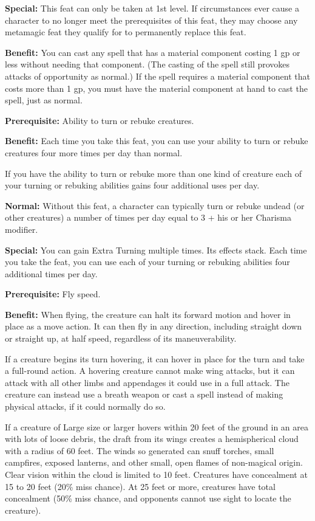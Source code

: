 \textbf{Special:} This feat can only be taken at 1st level. If circumstances ever cause a character to no longer meet the prerequisites of this feat, they may choose any metamagic feat they qualify for to permanently replace this feat.


\textbf{Benefit:} You can cast any spell that has a material component costing 1 gp or less without needing that component. (The casting of the spell still provokes attacks of opportunity as normal.) If the spell requires a material component that costs more than 1 gp, you must have the material component at hand to cast the spell, just as normal.


\textbf{Prerequisite:} Ability to turn or rebuke creatures.

\textbf{Benefit:} Each time you take this feat, you can use your ability to turn or rebuke creatures four more times per day than normal.

If you have the ability to turn or rebuke more than one kind of creature each of your turning or rebuking abilities gains four additional uses per day.

\textbf{Normal:} Without this feat, a character can typically turn or rebuke undead (or other creatures) a number of times per day equal to 3 + his or her Charisma modifier.

\textbf{Special:} You can gain Extra Turning multiple times. Its effects stack. Each time you take the feat, you can use each of your turning or rebuking abilities four additional times per day.


\textbf{Prerequisite:} Fly speed.

\textbf{Benefit:} When flying, the creature can halt its forward motion and hover in place as a move action. It can then fly in any direction, including straight down or straight up, at half speed, regardless of its maneuverability.

If a creature begins its turn hovering, it can hover in place for the turn and take a full-round action. A hovering creature cannot make wing attacks, but it can attack with all other limbs and appendages it could use in a full attack. The creature can instead use a breath weapon or cast a spell instead of making physical attacks, if it could normally do so.

If a creature of Large size or larger hovers within 20 feet of the ground in an area with lots of loose debris, the draft from its wings creates a hemispherical cloud with a radius of 60 feet. The winds so generated can snuff torches, small campfires, exposed lanterns, and other small, open flames of non-magical origin. Clear vision within the cloud is limited to 10 feet. Creatures have concealment at 15 to 20 feet (20\% miss chance). At 25 feet or more, creatures have total concealment 
(50\% miss chance, and opponents cannot use sight to locate the creature).

